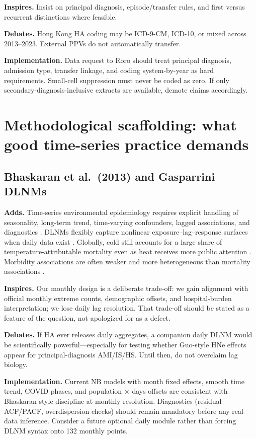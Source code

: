 \documentclass[11pt]{article}
\newcommand{\adds}{\textcolor{green!40!black}{\textbf{Adds.}}}
\newcommand{\inspires}{\textcolor{blue!55!black}{\textbf{Inspires.}}}
\newcommand{\debates}{\textcolor{orange!70!black}{\textbf{Debates.}}}
\newcommand{\impl}{\textcolor{purple!55!black}{\textbf{Implementation.}}}
\begin{document}
\inspires{} Insist on principal diagnosis, episode/transfer rules, and first versus
recurrent distinctions where feasible.

\debates{} Hong Kong HA coding may be ICD-9-CM, ICD-10, or mixed across 2013--2023.
External PPVs do not automatically transfer.

\impl{} Data request to Roro should treat principal diagnosis, admission type,
transfer linkage, and coding system-by-year as hard requirements. Small-cell
suppression must never be coded as zero. If only secondary-diagnosis-inclusive
extracts are available, demote claims accordingly.

\section{Methodological scaffolding: what good time-series practice demands}

\subsection{Bhaskaran et al.\ (2013) and Gasparrini DLNMs}

\adds{} Time-series environmental epidemiology requires explicit handling of
seasonality, long-term trend, time-varying confounders, lagged associations, and
diagnostics \citep{bhaskaran2013}. DLNMs flexibly capture nonlinear
exposure--lag--response surfaces when daily data exist \citep{gasparrini2010}.
Globally, cold still accounts for a large share of temperature-attributable
mortality even as heat receives more public attention \citep{gasparrini2015}.
Morbidity associations are often weaker and more heterogeneous than mortality
associations \citep{ye2012}.

\inspires{} Our monthly design is a deliberate trade-off: we gain alignment with
official monthly extreme counts, demographic offsets, and hospital-burden
interpretation; we lose daily lag resolution. That trade-off should be stated as a
feature of the question, not apologized for as a defect.

\debates{} If HA ever releases daily aggregates, a companion daily DLNM would be
scientifically powerful---especially for testing whether Guo-style HNe effects
appear for principal-diagnosis AMI/IS/HS. Until then, do not overclaim lag biology.

\impl{} Current NB models with month fixed effects, smooth time trend, COVID
phases, and population $\times$ days offsets are consistent with Bhaskaran-style
discipline at monthly resolution. Diagnostics (residual ACF/PACF, overdispersion
checks) should remain mandatory before any real-data inference. Consider a future
optional daily module rather than forcing DLNM syntax onto 132 monthly points.
\end{document}

